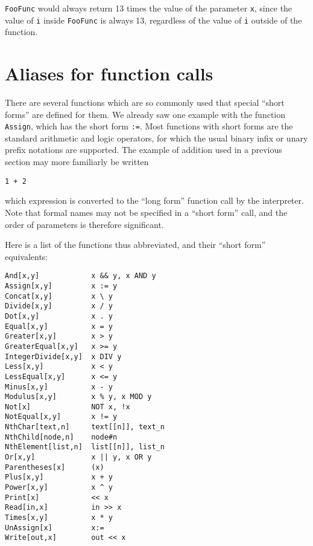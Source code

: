 \noindent \verb+FooFunc+ would always return 13 times the value of the
parameter \verb+x+, since the value of \verb+i+ inside \verb+FooFunc+
is always 13, regardless of the value of \verb+i+ outside of the
function.

\section{Aliases for function calls}

There are several functions which are so commonly used that special
``short forms'' are defined for them.  We already saw one example with
the function \verb+Assign+, which has the short form \verb+:=+.  Most
functions with short forms are the standard arithmetic and logic
operators, for which the usual binary infix or unary prefix notations
are supported.  The example of addition used in a previous section may
more familiarly be written

\begin{verbatim}
1 + 2
\end{verbatim}

\noindent which expression is converted to the ``long form'' function
call by the interpreter.  Note that formal names may not be specified
in a ``short form'' call, and the order of parameters is therefore
significant.

Here is a list of the functions thus abbreviated, and their ``short
form'' equivalents:

\medskip
\begin{multicols}{2}
\begin{verbatim}
And[x,y]            x && y, x AND y 
Assign[x,y]         x := y 
Concat[x,y]         x \ y 
Divide[x,y]         x / y
Dot[x,y]            x . y 
Equal[x,y]          x = y 
Greater[x,y]        x > y 
GreaterEqual[x,y]   x >= y
IntegerDivide[x,y]  x DIV y 
Less[x,y]           x < y 
LessEqual[x,y]      x <= y 
Minus[x,y]          x - y 
Modulus[x,y]        x % y, x MOD y 
Not[x]              NOT x, !x 
NotEqual[x,y]       x != y 
NthChar[text,n]     text[[n]], text_n 
NthChild[node,n]    node#n  
NthElement[list,n]  list[[n]], list_n
Or[x,y]             x || y, x OR y 
Parentheses[x]      (x) 
Plus[x,y]           x + y 
Power[x,y]          x ^ y 
Print[x]            << x
Read[in,x]          in >> x 
Times[x,y]          x * y 
UnAssign[x]         x:=
Write[out,x]        out << x 
\end{verbatim}
\end{multicols}

